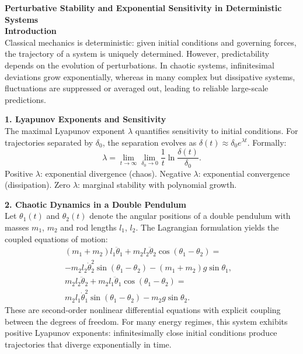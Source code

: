 \begin{technical}
{\Large\textbf{Perturbative Stability and Exponential Sensitivity in Deterministic Systems}}\\[0.7em]

\textbf{Introduction}\\[0.5em]
Classical mechanics is deterministic: given initial conditions and governing forces, the trajectory of a system is uniquely determined. However, predictability depends on the evolution of perturbations. In chaotic systems, infinitesimal deviations grow exponentially, whereas in many complex but dissipative systems, fluctuations are suppressed or averaged out, leading to reliable large-scale predictions.

\textbf{1. Lyapunov Exponents and Sensitivity}\\
The maximal Lyapunov exponent $\lambda$ quantifies sensitivity to initial conditions. For trajectories separated by $\delta_0$, the separation evolves as $\delta(t) \approx \delta_0 e^{\lambda t}$. Formally:
\[
\lambda = \lim_{t \to \infty} \lim_{\delta_0 \to 0} \frac{1}{t} \ln \frac{\delta(t)}{\delta_0}.
\]
Positive $\lambda$: exponential divergence (chaos). Negative $\lambda$: exponential convergence (dissipation). Zero $\lambda$: marginal stability with polynomial growth.

\textbf{2. Chaotic Dynamics in a Double Pendulum}\\
Let $\theta_1(t)$ and $\theta_2(t)$ denote the angular positions of a double pendulum with masses $m_1$, $m_2$ and rod lengths $l_1$, $l_2$. The Lagrangian formulation yields the coupled equations of motion:
\begin{align*}
(m_1 + m_2) l_1 \ddot{\theta}_1 
+ m_2 l_2 \ddot{\theta}_2 \cos(\theta_1 - \theta_2) 
=&\\ -m_2 l_2 \dot{\theta}_2^2 \sin(\theta_1 - \theta_2) 
- (m_1 + m_2) g \sin\theta_1, \\[0.5em]
m_2 l_2 \ddot{\theta}_2 
+ m_2 l_1 \ddot{\theta}_1 \cos(\theta_1 - \theta_2) 
=&\\ m_2 l_1 \dot{\theta}_1^2 \sin(\theta_1 - \theta_2) 
- m_2 g \sin\theta_2.
\end{align*}
These are second-order nonlinear differential equations with explicit coupling between the degrees of freedom. For many energy regimes, this system exhibits positive Lyapunov exponents: infinitesimally close initial conditions produce trajectories that diverge exponentially in time.


\end{technical}
